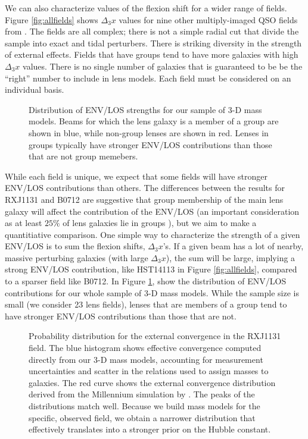 \documentclass{emulateapj}
\begin{document}
We can also characterize values of the flexion shift for a wider range of fields.  Figure \ref{fig:allfields} shows $\Delta_3 x$ values for nine other multiply-imaged QSO fields from \citet{Wong11}.  The fields are all complex; there is not a simple radial cut that divide the sample into exact and tidal perturbers.  There is striking diversity in the strength of external effects.  Fields that have groups tend to have more galaxies with high $\Delta_3 x$ values. There is no single number of galaxies that is guaranteed to be be the ``right'' number to include in lens models.  Each field must be considered on an individual basis.


\begin{figure}[t]
\centering
\caption{Distribution of ENV/LOS strengths for our sample of 3-D mass models. Beams for which the lens galaxy is a member of a group are shown in blue, while non-group lenses are shown in red. Lenses in groups typically have stronger ENV/LOS contributions than those that are not group memebers.}
\label{fig:d3xsums}
\end{figure}

While each field is unique, we expect that some fields will have stronger ENV/LOS contributions than others. The differences between the results for RXJ1131 and B0712 are suggestive that group membership of the main lens galaxy will affect the contribution of the ENV/LOS (an important consideration as at least $25\%$ of lens galaxies lie in groups \citealt{Keeton00}), but we aim to make a quantitiative comparison. One simple way to characterize the strength of a given ENV/LOS is to sum the flexion shifts, $\Delta_3 x$'s. If a given beam has a lot of nearby, massive perturbing galaxies (with large $\Delta_3 x$), the sum will be large, implying a strong ENV/LOS contribution, like HST14113 in Figure \ref{fig:allfields}, compared to a sparser field like B0712. In Figure \ref{fig:d3xsums}, show the distribution of ENV/LOS contributions for our whole sample of 3-D mass models. While the sample size is small (we consider 23 lens fields), lenses that are members of a group tend to have stronger ENV/LOS contributions than those that are not.


\begin{figure}[t]
\begin{center}
\caption{\label{fig:suyu} Probability distribution for the external convergence in the RXJ1131 field. The blue histogram shows effective convergence computed directly from our 3-D mass models, accounting for measurement uncertainties and scatter in the relations used to assign masses to galaxies. The red curve shows the external convergence distribution derived from the Millennium simulation by \citet{Suyu13}. The peaks of the distributions match well. Because we build mass models for the specific, observed field, we obtain a narrower distribution that effectively translates into a stronger prior on the Hubble constant.%
}
\end{center}
\end{figure}
\end{document}
